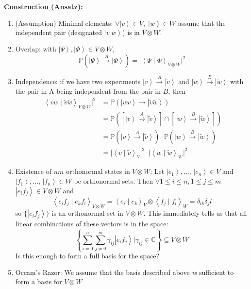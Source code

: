 \documentclass[12pt]{article}
\renewcommand{\P}{\mathbb{P}}
\newcommand{\brak}[1]{\left\langle #1 \right\rangle}
\newcommand{\C}{\mathbb{C}}
\newcommand{\ket}[1]{\left\vert #1 \right\rangle}
\begin{document}
\textbf{Construction (Ansatz):}
\begin{enumerate}
    \item (Assumption) Minimal elements: $\forall \ket v \in V,\; \ket w \in W$ assume that the independent pair (designated $\ket{v\;w}$) is in $V \otimes W$. 
    
    \item Overlap: with $\ket \Psi, \ket \Phi \in V\otimes W$, 
    \[\P(\ket \Psi \overset{A}{\to} \ket \Phi) = \bigg\vert \brak{\Psi \; | \; \Phi}_{V \otimes W} \bigg\vert^2\]

    \item Independence: if we have two experiments $\ket v \overset{A}{\to} \ket{\tilde{v}}$ and $\ket w \overset{B}{\to} \ket{\tilde w}$ with the pair in A being independent from the pair in $B$, then 
        \begin{align*}
            \bigg\vert \brak{v w \; | \; \tilde v \tilde w}_{V \otimes W} \bigg\vert^2 &= \P(\ket{vw} \to \ket{\tilde v \tilde w})\\
            &= \P([\ket{v} \overset{A}{\to} \ket{\tilde v}] \cap [\ket{w} \overset{B}{\to} \ket{\tilde w}])\\
            &= \P(\ket{v} \overset{A}{\to} \ket{\tilde v}) \cdot \P(\ket{w} \overset{B}{\to} \ket{\tilde w})\\
            &= \Big\vert \brak{v \; | \; \tilde v}_{V} \Big\vert^2 \;\; \Big\vert \brak{w \; | \; \tilde w}_{W} \Big\vert^2
        \end{align*}

        \item Existence of $nm$ orthonormal states in $V \otimes W$:
            Let $\ket{e_1}, \dots, \, \ket{e_n} \in V$ and $\ket{f_1}, \dots,\, \ket{f_n} \in W$ be orthonormal sets. Then $\forall 1 \leq i \leq n, 1 \leq j \leq m$ $\ket{e_i f_j} \in V \otimes W$ and 
            \[\brak{e_i f_j \; | \; e_k f_l}_{V \otimes W} = \brak{e_i \; | \; e_k}_V \otimes \brak{f_j \; | \; f_l}_W = \delta_{ik} \delta_jl\]
            so $\{\ket{e_i f_j}\}$ is an orthonormal set in $V \otimes W$. This immediately tells us that all linear combinations of these vectors is in the space:
            \[\left\{\sum_{i=0}^n \sum_{j=0}^m \gamma_{ij} \ket{e_i f_j} \bigg\vert \gamma_{ij} \in \C\right\} \subseteq V \otimes W\]
            Is this enough to form a full basis for the space? 

        \item Occam's Razor: We assume that the basis described above \emph{is} sufficient to form a basis for $V \otimes W$
\end{enumerate}
\end{document}
